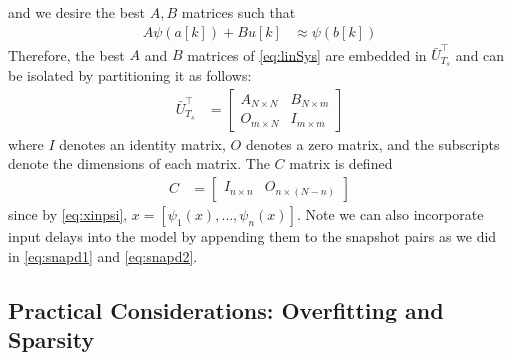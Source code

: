 and we desire the best $A,B$ matrices such that
\begin{align}
    A \psi(a[k]) + B u[k] &\approx \psi(b[k])
    \label{eq:linSys_psi}
\end{align}
Therefore, the best $A$ and $B$ matrices of \eqref{eq:linSys} are embedded in $\bar{U}_{T_s}^\top$ and can be isolated by partitioning it as follows:
\begin{align}
    \bar{U}_{T_s}^\top &= 
    \begin{bmatrix} 
        A_{N \times N} &
        B_{N \times m} \\
        O_{m \times N} &
        I_{m \times m}
    \end{bmatrix}
    \label{eq:AB}
\end{align}
where $I$ denotes an identity matrix, $O$ denotes a zero matrix, and the subscripts denote the dimensions of each matrix.
The $C$ matrix is defined
\begin{align}
    C &= \begin{bmatrix} I_{n \times n} & O_{n \times (N-n)} \end{bmatrix}
    \label{eq:C}
\end{align}
since by \eqref{eq:xinpsi}, ${x = [ \psi_1(x) , \dots , \psi_n(x) ]}$.
Note we can also incorporate input delays into the model by appending them to the snapshot pairs as we did in \eqref{eq:snapd1} and \eqref{eq:snapd2}.





\subsection{Practical Considerations: Overfitting and Sparsity} \label{subsec:sparsity}


